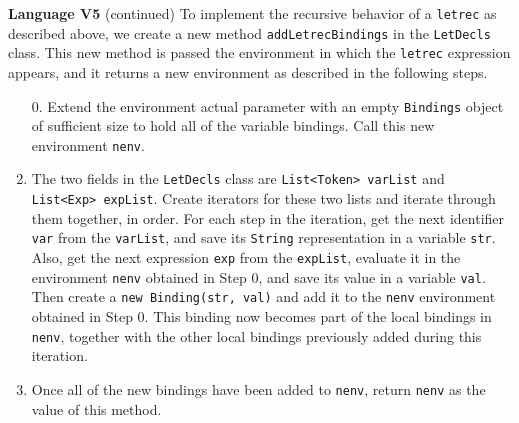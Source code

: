 \begin{minipage}[t]{\sw}
\slidenumber
\LARGE
{\bf Language V5} (continued)\exx
To implement the recursive behavior of a \verb'letrec' as described above,
we create a new method \verb'addLetrecBindings'
in the \verb'LetDecls' class.
This new method is passed the environment
in which the \verb'letrec' expression appears,
and it returns a new environment
as described in the following steps.
\begin{enumerate}
\item [0.]
  Extend the environment actual parameter
  with an empty \verb'Bindings' object of sufficient size
  to hold all of the variable bindings.
  Call this new environment \verb'nenv'.
\item
  The two fields in the \verb'LetDecls' class are
  \verb'List<Token> varList' and \verb'List<Exp> expList'.
  Create iterators for these two lists
  and iterate through them together, in order.
  For each step in the iteration,
  get the next identifier \verb'var' from the \verb'varList',
  and save its \verb'String' representation in a variable \verb'str'.
  Also, get the next expression \verb'exp' from the \verb'expList',
  evaluate it in the environment \verb'nenv'
  obtained in Step 0, and save its value in a variable \verb'val'.
  Then create a \verb'new Binding(str, val)'
  and add it to the \verb'nenv' environment obtained in Step 0.
  This binding now becomes part of the local bindings in \verb'nenv',
  together with the other local bindings previously added
  during this iteration.
\item
  Once all of the new bindings have been added to \verb'nenv',
  return \verb'nenv' as the value of this method.
\end{enumerate}
\end{minipage}
\clearpage
